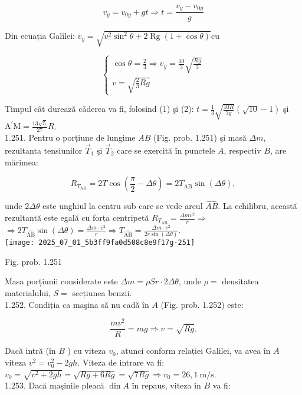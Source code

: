 \begin{equation*}
v_{y}=v_{0 y}+g t \Rightarrow t=\frac{v_{y}-v_{0 y}}{g} \tag{1}
\end{equation*}


Din ecuația Galilei: $v_{y}=\sqrt{v^{2} \sin ^{2} \theta+2 \operatorname{Rg}(1+\cos \theta)} \mathrm{cu}$

\[
\left\{\begin{array}{l}
\cos \theta=\frac{2}{3} \Rightarrow v_{y}=\frac{10}{3} \sqrt{\frac{R g}{3}}  \tag{2}\\
v=\sqrt{\frac{2}{3} R g}
\end{array}\right.
\]

Timpul cât durează cǎderea va fi, folosind (1) şi (2): $t=\frac{1}{3} \sqrt{\frac{10 R}{3 g}}(\sqrt{10}-1)$ şi $\mathrm{A}^{\prime} \mathrm{M}=\frac{13 \sqrt{5}}{27} R$.\\
1.251. Pentru o porțiune de lungime $A B$ (Fig. prob. 1.251) şi masă $\Delta m$, rezultanta tensiunilor $\vec{T}_{1}$ şi $\vec{T}_{2}$ care se exercită în punctele $A$, respectiv $B$, are mărimea:

$$
R_{T_{\mathrm{AB}}}=2 T \cos \left(\frac{\pi}{2}-\Delta \theta\right)=2 T_{\mathrm{AB}} \sin (\Delta \theta),
$$

unde $2 \Delta \theta$ este unghiul la centru sub care se vede arcul $\hat{A B}$. La echilibru, această rezultantă este egală cu forța centripetă $R_{T_{\mathrm{AB}}}=\frac{\Delta m v^{2}}{r} \Rightarrow$\\
$\Rightarrow 2 T_{\hat{\mathrm{AB}}} \sin (\Delta \theta)=\frac{\Delta m \cdot v^{2}}{r} \Rightarrow T_{\hat{\mathrm{AB}}}=\frac{\Delta m \cdot v^{2}}{2 r \sin (\Delta \theta)}$.\\
\texttt{[image: 2025\_07\_01\_5b3ff9fa0d508c8e9f17g-251]}

Fig. prob. 1.251

Masa porțiunii considerate este $\Delta m=\rho S r \cdot 2 \Delta \theta$, unde $\rho=$ densitatea materialului, $S=$ secțiunea benzii.\\
1.252. Condiția ca maşina să nu cadă în $A$ (Fig. prob. 1.252) este:

$$
\frac{m v^{2}}{R}=m g \Rightarrow v=\sqrt{R g} .
$$

Dacă intră (în $B$ ) cu viteza $v_{0}$, atunci conform relației Galilei, va avea în $A$ viteza $v^{2}=v_{0}^{2}-2 g h$. Viteza de intrare va fi:\\
$v_{0}=\sqrt{v^{2}+2 g h}=\sqrt{R g+6 R g}=\sqrt{7 R g} \Rightarrow v_{0}=26,1 \mathrm{~m} / \mathrm{s}$.\\
1.253. Dacă maşinile pleacă $\operatorname{din} A$ în repaus, viteza în $B$ va fi:

